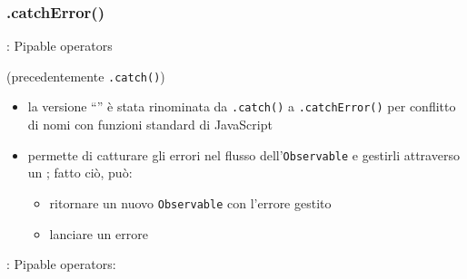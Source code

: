             \subsubsection{.catchError()}\label{subsub:catch}

            \begin{frame}{\insertsubsectionhead}{: Pipable operators}
                \begin{block}{\texttt{\insertsubsubsectionhead} (precedentemente \texttt{.catch()})}
                    \begin{itemize}
                        \item
                            la versione ``'' è stata rinominata da \texttt{.catch()} a \texttt{.catchError()} per conflitto di nomi con funzioni standard di JavaScript
                        \item
                            permette di catturare gli errori nel flusso dell'\texttt{Observable} e gestirli attraverso un ; fatto ciò, può:
                            \begin{itemize}
                                \item ritornare un nuovo \texttt{Observable} con l'errore gestito
                                \item lanciare un errore
                            \end{itemize}
                    \end{itemize}
                \end{block}
            \end{frame}


            \begin{frame}[c, fragile]{\insertsubsectionhead}{: Pipable operators: \texttt{\insertsubsubsectionhead}}
                \inputminted{js}{src/catch.js}
            \end{frame}

